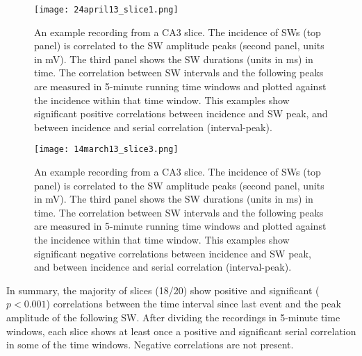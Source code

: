     \begin{figure}
      \centering
      \texttt{[image: 24april13\_slice1.png]}
      \caption{
        An example recording from a CA3 slice. The incidence of SWs (top panel)
        is correlated to the SW amplitude peaks (second panel, units in mV).
        The third panel shows the SW durations (units in ms) in time. The
        correlation between SW intervals and the following peaks are measured
        in 5-minute running time windows and plotted against the incidence
        within that time window. This examples show significant positive
        correlations between incidence and SW peak, and between incidence and
        serial correlation (interval-peak).
             }
      \label{fig:linear_inc-corr}
    \end{figure}

    \begin{figure}
      \centering
      \texttt{[image: 14march13\_slice3.png]}
      \caption{
        An example recording from a CA3 slice. The incidence of SWs (top panel)
        is correlated to the SW amplitude peaks (second panel, units in mV).
        The third panel shows the SW durations (units in ms) in time. The
        correlation between SW intervals and the following peaks are measured
        in 5-minute running time windows and plotted against the incidence
        within that time window. This examples show significant negative
        correlations between incidence and SW peak, and between incidence and
        serial correlation (interval-peak).
             }
      \label{fig:inv_linear_inc-corr}
    \end{figure}

    In summary, the majority of slices (18/20) show positive and significant
    ($p<0.001$) correlations between the time interval since last event and the
    peak amplitude of the following SW. After dividing the recordings in
    5-minute time windows, each slice shows at least once a positive and
    significant serial correlation in some of the time windows. Negative
    correlations are not present.

